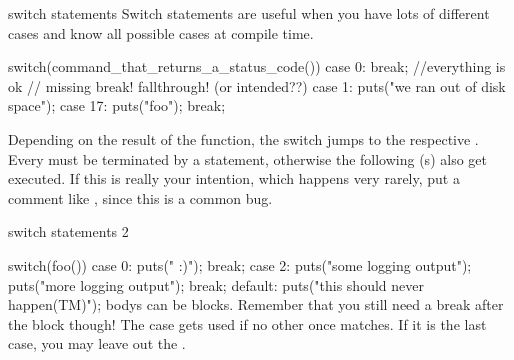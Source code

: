\documentclass[10pt,graphics,aspectratio=169,table]{beamer}
\begin{document}
\begin{frame}[fragile]{switch statements}
    Switch statements are useful when you have lots of different 
    cases and know all possible cases at compile time. 
    \begin{codeblock}
switch(command_that_returns_a_status_code()){
    case 0: break; //everything is ok
    // missing break! fallthrough! (or intended??)
    case 1: puts("we ran out of disk space"); 
    case 17: puts("foo"); break;
}
    \end{codeblock}

    Depending on the result of the function, the switch jumps to the respective
    . Every  must be terminated by a 
     statement, otherwise the following (s) also get
    executed. If this is really your intention, which happens very rarely,
    put a comment like , since this is a common bug.
\end{frame}

\begin{frame}[fragile]{switch statements 2}
\begin{codeblock}
    switch(foo()){
        case 0: puts(" :)"); break;
        case 2: {
            puts("some logging output");
            puts("more logging output");
        }break;
        default: puts("this should never happen(TM)"); 
    }
     bodys can be blocks. Remember that you still need a break 
    after the block though! The  case gets used if no other once
    matches. If it is the last case, you may leave out the .
\end{codeblock}
\end{frame}
\end{document}
